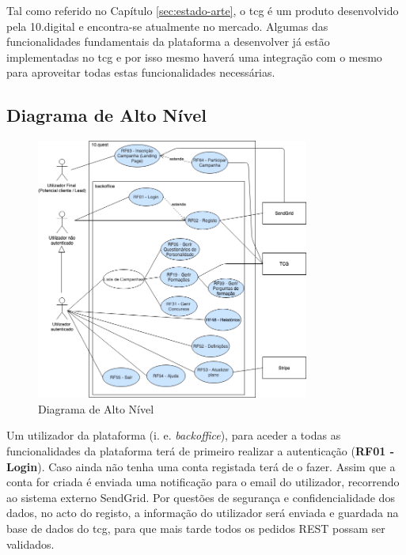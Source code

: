 Tal como referido no Capítulo \ref{sec:estado-arte}, o \acrshort{tcg} é um produto desenvolvido pela 10.digital e encontra-se atualmente no mercado. Algumas das funcionalidades fundamentais da plataforma a desenvolver já estão implementadas no \acrshort{tcg}  e por isso mesmo haverá uma integração com o mesmo para aproveitar todas estas funcionalidades necessárias.


\newpage

\subsection{Diagrama de Alto Nível}
\label{d:altonivel}
\begin{figure}[ht!]
	\begin{center}
		\includegraphics[width=0.8\textwidth]{img/rf/alto-nivel}
		\caption{Diagrama de Alto Nível}
		\label{fig:rf-alto-nivel}
	\end{center}
\end{figure}

Um utilizador da plataforma (i. e. \textit{backoffice}), para aceder a todas as funcionalidades da plataforma terá de primeiro realizar a autenticação (\textbf{RF01 - Login}). Caso ainda não tenha uma conta registada terá de o fazer. Assim que a conta for criada é enviada uma notificação para o email do utilizador, recorrendo ao sistema externo SendGrid. Por questões de segurança e confidencialidade dos dados, no acto do registo, a informação do utilizador será enviada e guardada na base de dados do \acrshort{tcg}, para que mais tarde todos os pedidos REST possam ser validados.

